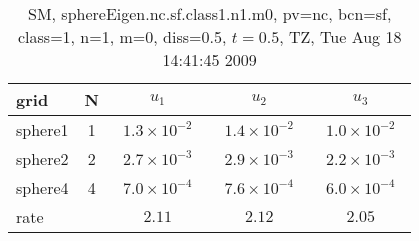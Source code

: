 \begin{table}[hbt]\tableFont %
\begin{center}
\begin{tabular}{|l|c|c|c|c|} \hline 
grid  & N &  $u_1$ & $u_2$ & $u_3$  \\ \hline 
             sphere1 &     1 & ~$1.3\times10^{ -2}$~ & ~$1.4\times10^{ -2}$~ & ~$1.0\times10^{ -2}$~  \\ \hline
             sphere2 &     2 & ~$2.7\times10^{ -3}$~ & ~$2.9\times10^{ -3}$~ & ~$2.2\times10^{ -3}$~  \\ \hline
             sphere4 &     4 & ~$7.0\times10^{ -4}$~ & ~$7.6\times10^{ -4}$~ & ~$6.0\times10^{ -4}$~  \\ \hline
    rate             &       &       $2.11$          &       $2.12$          &       $2.05$           \\ \hline
\end{tabular}
\caption{SM, sphereEigen.nc.sf.class1.n1.m0, pv=nc, bcn=sf, class=1, n=1, m=0, diss=0.5, $t=0.5$,  TZ, Tue Aug 18 14:41:45 2009}\label{table:sphereEigen.nc.sf.class1.n1.m0}
\end{center}
\end{table}
